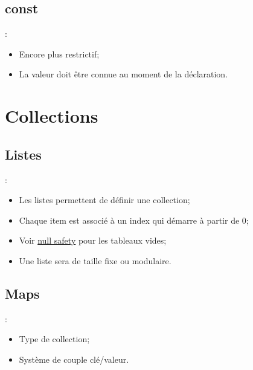 \documentclass[10pt]{beamer}
\begin{document}
\subsection{const}
\begin{frame}[fragile,t]{\secname : \subsecname}
    \begin{itemize}
        \item Encore plus restrictif;
        \item La valeur doit être connue au moment de la déclaration.
    \end{itemize}
    
\end{frame}

\section{Collections}
\subsection{Listes}
\begin{frame}[fragile,t]{\secname : \subsecname}
    \begin{itemize}
        \item Les listes permettent de définir une collection;
        \item Chaque item est associé à un index qui démarre à partir de 0;
        \item Voir \href{https://dart.dev/null-safety}{null safety} pour les tableaux vides;
        \item Une liste sera de taille fixe ou modulaire.
    \end{itemize}
    
\end{frame}
\subsection{Maps}
\begin{frame}[fragile,t]{\secname : \subsecname}
    \begin{itemize}
        \item Type de collection;
        \item Système de couple clé/valeur.
    \end{itemize}
    
\end{frame}
\end{document}
